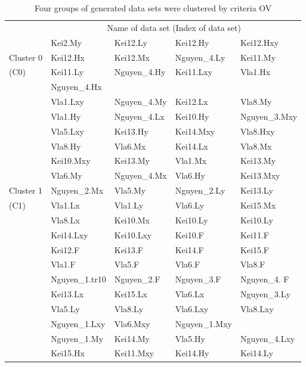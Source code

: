 \begin{table}
\caption{Four groups of generated data sets were clustered by criteria OV}
\label{tab:cluster}       %
\begin{tabular}{lllll}
\hline\noalign{\smallskip}
& \multicolumn{4}{c}{Name of data set (Index of data set)} \\
\noalign{\smallskip}\hline\noalign{\smallskip}
& Kei2.My & Kei12.Ly & Kei12.Hy & Kei12.Hxy \\
Cluster 0 & Kei12.Hx & Kei12.Mx & Nguyen\_4.Ly & Kei11.My \\
(C0) & Kei11.Ly & Nguyen\_4.Hy & Kei11.Lxy & Vla1.Hx \\
& Nguyen\_4.Hx & & & \\
\hline
& Vla1.Lxy & Nguyen\_4.My & Kei12.Lx & Vla8.My \\
& Vla1.Hy & Nguyen\_4.Lx & Kei10.Hy & Nguyen\_3.Mxy \\
& Vla5.Lxy & Kei13.Hy & Kei14.Mxy & Vla8.Hxy \\
& Vla8.Hy & Vla6.Mx & Kei14.Lx & Vla8.Mx \\
& Kei10.Mxy & Kei13.My & Vla1.Mx & Kei13.My \\
& Vla6.My & Nguyen\_4.Mx & Vla6.Hy & Kei13.Mxy \\
Cluster 1 & Nguyen\_2.Mx & Vla5.My & Nguyen\_2.Ly & Kei13.Ly \\
(C1) & Vla1.Lx & Vla1.Ly & Vla6.Ly & Kei15.Mx \\
& Vla8.Lx & Kei10.Mx & Kei10.Ly & Kei10.Ly \\
& Kei14.Lxy & Kei10.Lxy & Kei10.F & Kei11.F \\
& Kei12.F & Kei13.F & Kei14.F & Kei15.F \\
& Vla1.F & Vla5.F & Vla6.F & Vla8.F \\
& Nguyen\_1.tr10 & Nguyen\_2.F & Nguyen\_3.F & Nguyen\_4. F \\
& Kei13.Lx & Kei15.Lx & Vla6.Lx & Nguyen\_3.Ly \\
& Vla5.Ly & Vla8.Ly & Vla6.Lxy & Vla8.Lxy \\
& Nguyen\_1.Lxy & Vla6.Mxy & Nguyen\_1.Mxy & \\
\hline
& Nguyen\_1.My & Kei14.My & Vla5.Hy & Nguyen\_4.Lxy \\
& Kei15.Hx & Kei11.Mxy & Kei14.Hy & Kei14.Ly \\

\end{tabular}
\end{table}
